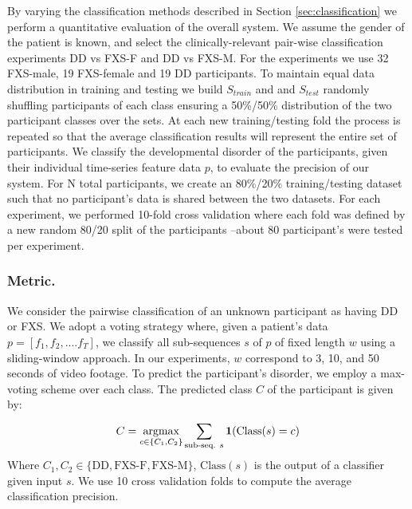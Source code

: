 \documentclass{llncs}
\begin{document}
\vspace*{-\baselineskip}
By varying the classification methods described in Section \ref{sec:classification} we perform a quantitative evaluation of the overall system.
We assume the gender of the patient is known, and select the clinically-relevant pair-wise classification experiments DD vs FXS-F and DD vs FXS-M. For the experiments we use 32 FXS-male, 19 FXS-female and 19 DD participants. To maintain equal data distribution in training and testing we build $S_{train}$ and and $S_{test}$ randomly shuffling participants of each class ensuring a 50\%/50\% distribution of the two participant classes over the sets. At each new training/testing fold the process is repeated so that the average classification results will represent the entire set of participants. We classify the developmental disorder of the participants, given their individual time-series feature data $p$, to evaluate the precision of our system. For N total participants, we create an 80\%/20\% training/testing dataset such that no participant's data is shared between the two datasets. For each experiment, we performed 10-fold cross validation where each fold was defined by a new random 80/20 split of the participants --about 80 participant's were tested per experiment. %
\vspace*{-\baselineskip}
\subsubsection{Metric.}
We consider the pairwise classification of an unknown participant as having DD or FXS. We adopt a voting strategy where, given a patient's data $p=[f_1, f_2,....f_{T}]$, we classify all sub-sequences $s$ of $p$ of fixed length $w$ using a sliding-window approach. In our experiments, $w$ correspond to 3, 10, and 50 seconds of video footage. To predict the participant's disorder, we employ a max-voting scheme over each class. The predicted class $C$ of the participant is given by:
\begin{equation}
C = \underset{c \in \{C_1, C_2\}} {\operatorname{argmax}} \sum_{\text{sub-seq. } s}^{} \bold{1}(\text{Class}(s) = c)
\end{equation}
Where $C_1, C_2 \in \{\text{DD}, \text{FXS-F}, \text{FXS-M}\}$, $\text{Class}(s)$ is the output of a classifier given input $s$. We use 10 cross validation folds to compute the average classification precision.
\end{document}
